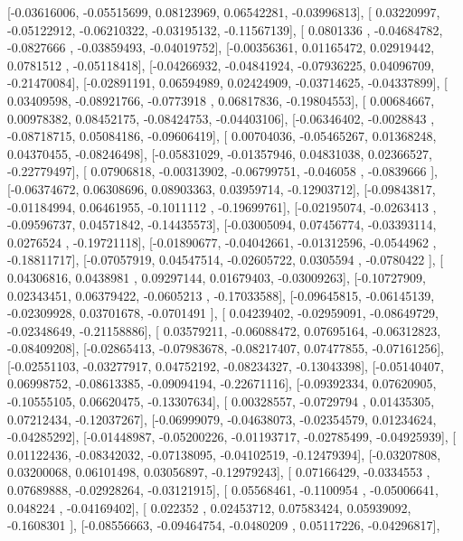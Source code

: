 \documentclass{article}
\begin{document}
       [-0.03616006, -0.05515699,  0.08123969,  0.06542281, -0.03996813],
       [ 0.03220997, -0.05122912, -0.06210322, -0.03195132, -0.11567139],
       [ 0.0801336 , -0.04684782, -0.0827666 , -0.03859493, -0.04019752],
       [-0.00356361,  0.01165472,  0.02919442,  0.0781512 , -0.05118418],
       [-0.04266932, -0.04841924, -0.07936225,  0.04096709, -0.21470084],
       [-0.02891191,  0.06594989,  0.02424909, -0.03714625, -0.04337899],
       [ 0.03409598, -0.08921766, -0.0773918 ,  0.06817836, -0.19804553],
       [ 0.00684667,  0.00978382,  0.08452175, -0.08424753, -0.04403106],
       [-0.06346402, -0.0028843 , -0.08718715,  0.05084186, -0.09606419],
       [ 0.00704036, -0.05465267,  0.01368248,  0.04370455, -0.08246498],
       [-0.05831029, -0.01357946,  0.04831038,  0.02366527, -0.22779497],
       [ 0.07906818, -0.00313902, -0.06799751, -0.046058  , -0.0839666 ],
       [-0.06374672,  0.06308696,  0.08903363,  0.03959714, -0.12903712],
       [-0.09843817, -0.01184994,  0.06461955, -0.1011112 , -0.19699761],
       [-0.02195074, -0.0263413 , -0.09596737,  0.04571842, -0.14435573],
       [-0.03005094,  0.07456774, -0.03393114,  0.0276524 , -0.19721118],
       [-0.01890677, -0.04042661, -0.01312596, -0.0544962 , -0.18811717],
       [-0.07057919,  0.04547514, -0.02605722,  0.0305594 , -0.0780422 ],
       [ 0.04306816,  0.0438981 ,  0.09297144,  0.01679403, -0.03009263],
       [-0.10727909,  0.02343451,  0.06379422, -0.0605213 , -0.17033588],
       [-0.09645815, -0.06145139, -0.02309928,  0.03701678, -0.0701491 ],
       [ 0.04239402, -0.02959091, -0.08649729, -0.02348649, -0.21158886],
       [ 0.03579211, -0.06088472,  0.07695164, -0.06312823, -0.08409208],
       [-0.02865413, -0.07983678, -0.08217407,  0.07477855, -0.07161256],
       [-0.02551103, -0.03277917,  0.04752192, -0.08234327, -0.13043398],
       [-0.05140407,  0.06998752, -0.08613385, -0.09094194, -0.22671116],
       [-0.09392334,  0.07620905, -0.10555105,  0.06620475, -0.13307634],
       [ 0.00328557, -0.0729794 ,  0.01435305,  0.07212434, -0.12037267],
       [-0.06999079, -0.04638073, -0.02354579,  0.01234624, -0.04285292],
       [-0.01448987, -0.05200226, -0.01193717, -0.02785499, -0.04925939],
       [ 0.01122436, -0.08342032, -0.07138095, -0.04102519, -0.12479394],
       [-0.03207808,  0.03200068,  0.06101498,  0.03056897, -0.12979243],
       [ 0.07166429, -0.0334553 ,  0.07689888, -0.02928264, -0.03121915],
       [ 0.05568461, -0.1100954 , -0.05006641,  0.048224  , -0.04169402],
       [ 0.022352  ,  0.02453712,  0.07583424,  0.05939092, -0.1608301 ],
       [-0.08556663, -0.09464754, -0.0480209 ,  0.05117226, -0.04296817],
\end{document}
